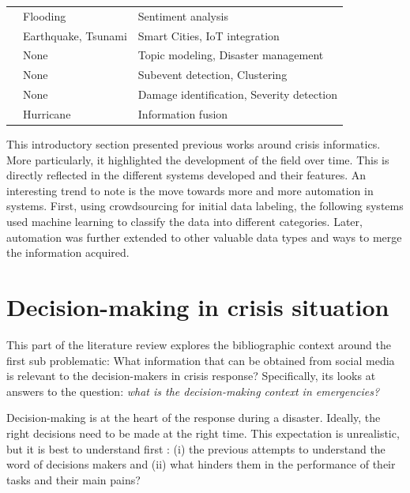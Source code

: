 \begin{table}[hbp]
\begin{tabular}{m{} m{} m{}}
        \cite{raginiBigDataAnalytics2018}               & Flooding              & Sentiment analysis                                       \\
        \cite{shahDisasterResilientSmart2019}           & Earthquake, Tsunami   & Smart Cities, IoT integration                            \\
        \cite{grunder-fahrerTopicsTopicalPhases2018}    & None                  & Topic modeling, Disaster management                      \\
        \cite{wuStreamExplorerMultiStageSystem2018}     & None                  & Subevent detection, Clustering                           \\
        \cite{agarwalCrisisDIASMultimodalDamage2020}    & None                  & Damage identification, Severity detection                \\
        \cite{alamDescriptiveVisualSummaries2020}       & Hurricane             & Information fusion                                       \\
        \bottomrule
    \end{tabular}
    \label{table:crisis-informatic-main-articles}
\end{table}

This introductory section presented previous works around crisis informatics.
More particularly, it highlighted the development of the field over time.
This is directly reflected in the different systems developed and their features.
An interesting trend to note is the move towards more and more automation in systems.
First, using crowdsourcing for initial data labeling, the following systems used machine learning to classify the data into different categories.
Later, automation was further extended to other valuable data types and ways to merge the information acquired.

\section{Decision-making in crisis situation}
This part of the literature review explores the bibliographic context around the first sub problematic: What information that can be obtained from social media is relevant to the decision-makers in crisis response?
Specifically, its looks at answers to the question: \emph{what is the decision-making context in emergencies?}

Decision-making is at the heart of the response during a disaster.
Ideally, the right decisions need to be made at the right time.
This expectation is unrealistic, but it is best to understand first
: (i) the previous attempts to understand the word of decisions makers and
(ii) what hinders them in the performance of their tasks and their main pains?

